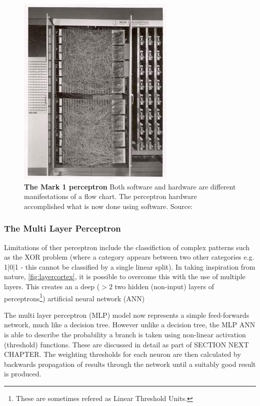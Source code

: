 \begin{figure}[H]
     \centering
         \includegraphics[width=.45\textwidth]{figures_c3/mlpregressor/Mark_I_perceptron.jpg}
        \caption{\textbf{The Mark 1 perceptron} Both software and hardware are different manifestations of a flow chart. The perceptron hardware accomplished what is now done using software. Source: \cite{perceptronimage}}
        \label{fig:perceptron}
\end{figure}

\subsubsection{The Multi Layer Perceptron}
Limitations of ther perceptron include the classifiction of complex patterns such as the XOR problem (where a category appears between two other categories e.g. {1|0|1} - this cannot be classified by a single linear split). In taking inspiration from nature, \autoref{fig:layercortex}, it is possible to overcome this with the use of multiple layers. This creates an a deep ($>2$ two hidden (non-input) layers of perceptrons\footnote{These are sometimes refered as Linear Threshold Units.}) artificial neural network (ANN) 

The multi layer perceptron (MLP) model now represents a simple feed-forwards network, much like a decision tree. However unlike a decision tree, the MLP ANN is able to describe the probability a branch is taken using non-linear activation (threshold) functions. These are discussed in detail as part of SECTION NEXT CHAPTER. The weighting thresholds for each neuron are then calculated by backwards propagation of results through the network until a suitably good result is produced. 

